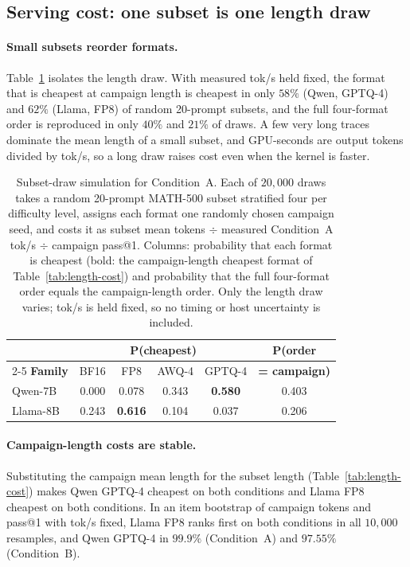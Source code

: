 \documentclass[11pt,a4paper]{article}
\begin{document}
\subsection{Serving cost: one subset is one length draw}
\label{sec:cost-results}
\paragraph{Small subsets reorder formats.} Table~\ref{tab:subsetsim} isolates the length draw. With measured tok/s held fixed, the format that is cheapest at campaign length is cheapest in only $58\%$ (Qwen, GPTQ-4) and $62\%$ (Llama, FP8) of random 20-prompt subsets, and the full four-format order is reproduced in only $40\%$ and $21\%$ of draws. A few very long traces dominate the mean length of a small subset, and GPU-seconds are output tokens divided by tok/s, so a long draw raises cost even when the kernel is faster.

\begin{table}[t]
\centering
\caption{Subset-draw simulation for Condition~A. Each of $20{,}000$ draws takes a random 20-prompt MATH-500 subset stratified four per difficulty level, assigns each format one randomly chosen campaign seed, and costs it as subset mean tokens $\div$ measured Condition~A tok/s $\div$ campaign pass@1. Columns: probability that each format is cheapest (bold: the campaign-length cheapest format of Table~\ref{tab:length-cost}) and probability that the full four-format order equals the campaign-length order. Only the length draw varies; tok/s is held fixed, so no timing or host uncertainty is included.}
\label{tab:subsetsim}
\small
\begin{tabular}{lccccc}
\toprule
 & \multicolumn{4}{c}{\textbf{P(cheapest)}} & \textbf{P(order} \\
\cmidrule(lr){2-5}
\textbf{Family} & BF16 & FP8 & AWQ-4 & GPTQ-4 & \textbf{= campaign)} \\
\midrule
Qwen-7B & 0.000 & 0.078 & 0.343 & \textbf{0.580} & 0.403 \\
Llama-8B & 0.243 & \textbf{0.616} & 0.104 & 0.037 & 0.206 \\
\bottomrule
\end{tabular}
\end{table}

\paragraph{Campaign-length costs are stable.} Substituting the campaign mean length for the subset length (Table~\ref{tab:length-cost}) makes Qwen GPTQ-4 cheapest on both conditions and Llama FP8 cheapest on both conditions. In an item bootstrap of campaign tokens and pass@1 with tok/s fixed, Llama FP8 ranks first on both conditions in all $10{,}000$ resamples, and Qwen GPTQ-4 in $99.9\%$ (Condition~A) and $97.55\%$ (Condition~B).
\end{document}
